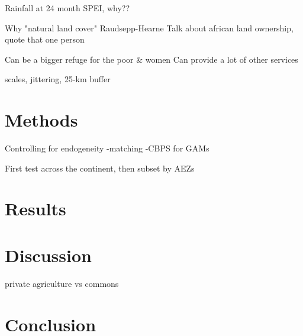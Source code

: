 \documentclass{article}
\begin{document}
Rainfall at 24 month SPEI, why??

Why "natural land cover"
	Raudsepp-Hearne
	Talk about african land ownership, quote that one person
	
	Can be a bigger refuge for the poor \& women
	Can provide a lot of other services
	
	scales, jittering, 25-km buffer
	

\section{Methods}
Controlling for endogeneity
	-matching
	-CBPS for GAMs

First test across the continent, then subset by AEZs

\section{Results}


\section{Discussion}

private agriculture vs commons

\section{Conclusion}




\end{document}
